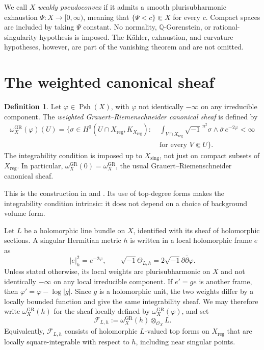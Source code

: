 \documentclass[11pt,a4paper,reqno]{amsart}
\theoremstyle{definition}
\newtheorem{definition}[theorem]{Definition}
\theoremstyle{remark}
\numberwithin{equation}{section}
\newcommand{\OO}{\mathcal O}
\newcommand{\FF}{\mathcal F}
\newcommand{\reg}{\mathrm{reg}}
\newcommand{\sing}{\mathrm{sing}}
\newcommand{\GR}{\mathrm{GR}}
\newcommand{\db}{\bar\partial}
\newcommand{\ii}{\sqrt{-1}}
\newcommand{\wGR}{\omega_X^{\GR}}
\DeclareMathOperator{\Psh}{Psh}
\begin{document}
We call $X$ \emph{weakly pseudoconvex} if it admits a smooth
plurisubharmonic exhaustion $\Psi:X\to[0,\infty)$, meaning that
$\{\Psi<c\}\Subset X$ for every $c$. Compact spaces are included by taking
$\Psi$ constant. No normality, $\mathbb Q$-Gorenstein, or rational-singularity
hypothesis is imposed. The K\"ahler, exhaustion, and curvature hypotheses,
however, are part of the vanishing theorem and are not omitted.

\section{The weighted canonical sheaf}
\label{sec:sheaf}

\begin{definition}
Let $\varphi\in\Psh(X)$, with $\varphi$ not identically $-\infty$ on any
irreducible component. The \emph{weighted Grauert--Riemenschneider
canonical sheaf} is defined by
\begin{equation}\label{eq:definition}
\begin{split}
\wGR(\varphi)(U)=\biggl\{\sigma\in
H^0(U\cap X_{\reg},K_{X_{\reg}}):\;&
\int_{V\cap X_{\reg}}
\ii^{\,n^2}\sigma\wedge\overline\sigma\,e^{-2\varphi}<\infty\\
&\text{for every }V\Subset U\biggr\}.
\end{split}
\end{equation}
The integrability condition is imposed up to $X_{\sing}$, not just on
compact subsets of $X_{\reg}$. In particular,
$\wGR(0)=\wGR$, the usual Grauert--Riemenschneider canonical sheaf.
\end{definition}

This is the construction in \cite[Remark~5.17]{Demailly} and
\cite[Remark~2.2]{Li}. Its use of top-degree forms makes the integrability
condition intrinsic: it does not depend on a choice of background volume
form.

Let $L$ be a holomorphic line bundle on $X$, identified with its sheaf of
holomorphic sections. A singular Hermitian metric $h$ is written in a
local holomorphic frame $e$ as
\begin{equation}\label{eq:convention}
 |e|_h^2=e^{-2\varphi},
 \qquad \ii\Theta_{L,h}=2\ii\partial\db\varphi.
\end{equation}
Unless stated otherwise, its local weights are plurisubharmonic on $X$
and not identically $-\infty$ on any local irreducible component.
If $e'=g e$ is another frame, then $\varphi'=\varphi-\log|g|$.
Since $g$ is a holomorphic unit, the two weights differ by a locally
bounded function and give the same integrability sheaf. We may therefore
write $\wGR(h)$ for the sheaf locally defined by $\wGR(\varphi)$, and set
\begin{equation}\label{eq:F}
 \FF_{L,h}:=\wGR(h)\otimes_{\OO_X}L.
\end{equation}
Equivalently, $\FF_{L,h}$ consists of holomorphic $L$-valued top forms on
$X_{\reg}$ that are locally square-integrable with respect to $h$, including
near singular points.
\end{document}
